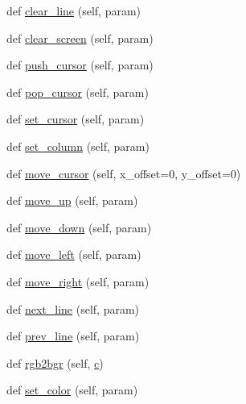 \begin{DoxyCompactItemize}
\item 
def \hyperlink{classwaflib_1_1ansiterm_1_1_ansi_term_ae9df276c42e0569ad63c20c19de62b93}{clear\+\_\+line} (self, param)
\item 
def \hyperlink{classwaflib_1_1ansiterm_1_1_ansi_term_aa94cc04f29c4c51e0013e5cb87c0fd07}{clear\+\_\+screen} (self, param)
\item 
def \hyperlink{classwaflib_1_1ansiterm_1_1_ansi_term_a9f489138508401c64c6927f215d8d6da}{push\+\_\+cursor} (self, param)
\item 
def \hyperlink{classwaflib_1_1ansiterm_1_1_ansi_term_a2093c2f7ded18188b0bf2989a0083a18}{pop\+\_\+cursor} (self, param)
\item 
def \hyperlink{classwaflib_1_1ansiterm_1_1_ansi_term_aba842837a7fe351aa8459aa375249c69}{set\+\_\+cursor} (self, param)
\item 
def \hyperlink{classwaflib_1_1ansiterm_1_1_ansi_term_acd65956a7d56681cc669acca5bdd43fb}{set\+\_\+column} (self, param)
\item 
def \hyperlink{classwaflib_1_1ansiterm_1_1_ansi_term_ade95c6eb1c7ed7928780aad4e6b4e268}{move\+\_\+cursor} (self, x\+\_\+offset=0, y\+\_\+offset=0)
\item 
def \hyperlink{classwaflib_1_1ansiterm_1_1_ansi_term_a7725bd9ed185458669ad7601fb7ff9d9}{move\+\_\+up} (self, param)
\item 
def \hyperlink{classwaflib_1_1ansiterm_1_1_ansi_term_a7b2ea0403457b7cd8d0ac4088064d812}{move\+\_\+down} (self, param)
\item 
def \hyperlink{classwaflib_1_1ansiterm_1_1_ansi_term_a617dda0ced0a3e3f3443366d4a1c46bb}{move\+\_\+left} (self, param)
\item 
def \hyperlink{classwaflib_1_1ansiterm_1_1_ansi_term_a1388984c5cb5051d6c48682d1cd998b7}{move\+\_\+right} (self, param)
\item 
def \hyperlink{classwaflib_1_1ansiterm_1_1_ansi_term_a8ce79cf478dc1bf0cec2c12e28103522}{next\+\_\+line} (self, param)
\item 
def \hyperlink{classwaflib_1_1ansiterm_1_1_ansi_term_ac65f3453904e9c561f530b7c43e73f12}{prev\+\_\+line} (self, param)
\item 
def \hyperlink{classwaflib_1_1ansiterm_1_1_ansi_term_ad097d16ecb1babcef5970faccad1e7e9}{rgb2bgr} (self, \hyperlink{rfft2d_test_m_l_8m_ae0323a9039add2978bf5b49550572c7c}{c})
\item 
def \hyperlink{classwaflib_1_1ansiterm_1_1_ansi_term_a2b56ee3c8294f7e2e5bca7cc60e8ee05}{set\+\_\+color} (self, param)
\item 

\end{DoxyCompactItemize}
